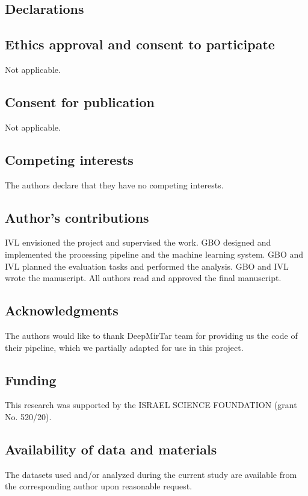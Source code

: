 \documentclass{bmcart}
\begin{document}
\begin{backmatter}
\section*{Declarations}

\subsection*{Ethics approval and consent to participate}
Not applicable.

\subsection*{Consent for publication}
Not applicable.

\subsection*{Competing interests}
The authors declare that they have no competing interests.

\subsection*{Author's contributions}
IVL envisioned the project and supervised the work. GBO designed and implemented the processing pipeline and the machine learning system. GBO and IVL planned the evaluation tasks and performed the analysis. GBO and IVL wrote the manuscript.  All authors read and approved the final manuscript.
    
\subsection*{Acknowledgments}
The authors would like to thank DeepMirTar team for providing us the code of their pipeline, which we partially adapted for use in this project.
  
\subsection*{Funding}
This research was supported by the ISRAEL SCIENCE FOUNDATION (grant No. 520/20).

\subsection*{Availability of data and materials}
The datasets used and/or analyzed during the current study are available from the corresponding author upon reasonable request.
 

\end{backmatter}
\end{document}
